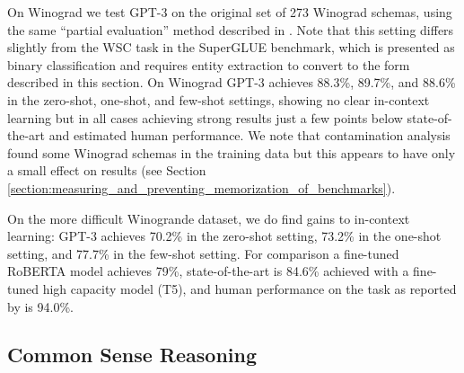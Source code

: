 \documentclass{article}
\begin{document}
On Winograd we test GPT-3 on the original set of 273 Winograd schemas, using the same ``partial evaluation'' method described in \cite{radford2019language}.  Note that this setting differs slightly from the WSC task in the SuperGLUE benchmark, which is presented as binary classification and requires entity extraction to convert to the form described in this section.  On Winograd GPT-3 achieves 88.3\%, 89.7\%, and 88.6\% in the zero-shot, one-shot, and few-shot settings, showing no clear in-context learning but in all cases achieving strong results just a few points below state-of-the-art and estimated human performance.  We note that contamination analysis found some Winograd schemas in the training data but this appears to have only a small effect on results (see Section \ref{section:measuring_and_preventing_memorization_of_benchmarks}).

On the more difficult Winogrande dataset, we do find gains to in-context learning: GPT-3 achieves 70.2\% in the zero-shot setting, 73.2\% in the one-shot setting, and 77.7\% in the few-shot setting.  For comparison a fine-tuned RoBERTA model achieves 79\%, state-of-the-art is 84.6\% achieved with a fine-tuned high capacity model (T5), and human performance on the task as reported by \cite{sakaguchi2019winogrande} is 94.0\%.

    \subsection{Common Sense Reasoning}
    \label{section:Common_Sense_Reasoning}
\end{document}
